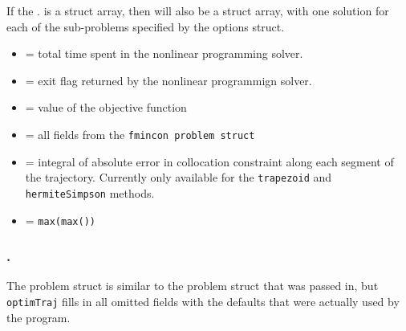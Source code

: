 \par If the . is a struct array, then  will also be a struct array, with one solution for each of the sub-problems specified by the options struct.

\begin{itemize} \setlength\itemsep{-0.1em}
\item {} = total time spent in the nonlinear programming solver.
\item {} = exit flag returned by the nonlinear programmign solver.
\item {} = value of the objective function
\item {} = all fields from the \texttt{fmincon problem struct} 
\item {} = integral of absolute error in collocation constraint along each segment of the trajectory. Currently only available for the \texttt{trapezoid} and \texttt{hermiteSimpson} methods. 
\item {} = \texttt{max(max())}
\end{itemize}

\subsubsection*{.}

The problem struct is similar to the problem struct that was passed in, but \texttt{optimTraj} fills in all omitted fields with the defaults that were actually used by the program.